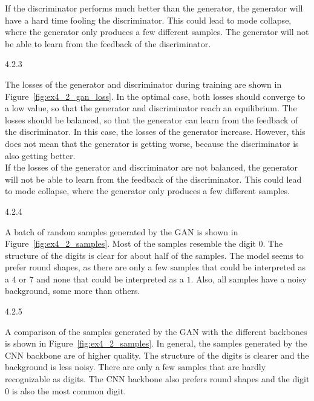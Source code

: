 If the discriminator performs much better than the generator, the generator will have a hard time
fooling the discriminator. This could lead to mode collapse, where the generator only produces a few
different samples. The generator will not be able to learn from the feedback of the discriminator.


\begin{task}{4.2.3}
\end{task}

The losses of the generator and discriminator during training are shown in
Figure~\ref{fig:ex4_2_gan_loss}. In the optimal case, both losses should converge to a low value, so
that the generator and discriminator reach an equilibrium. The losses should be balanced, so that
the generator can learn from the feedback of the discriminator. In this case, the losses of the
generator increase. However, this does not mean that the generator is getting worse, because the
discriminator is also getting better.\\
If the losses of the generator and discriminator are not balanced, the generator will not be able to
learn from the feedback of the discriminator. This could lead to mode collapse, where the generator
only produces a few different samples.


\begin{task}{4.2.4}
\end{task}

A batch of random samples generated by the GAN is shown in Figure~\ref{fig:ex4_2_samples}. Most of
the samples resemble the digit $0$. The structure of the digits is clear for about half of the
samples. The model seems to prefer round shapes, as there are only a few samples that could be
interpreted as a $4$ or $7$ and none that could be interpreted as a $1$. Also, all samples have
a noisy background, some more than others.


\begin{task}{4.2.5}
\end{task}

A comparison of the samples generated by the GAN with the different backbones is shown in
Figure~\ref{fig:ex4_2_samples}. In general, the samples generated by the CNN backbone are of higher
quality. The structure of the digits is clearer and the background is less noisy. There are only a
few samples that are hardly recognizable as digits. The CNN backbone also prefers round shapes and
the digit $0$ is also the most common digit.

